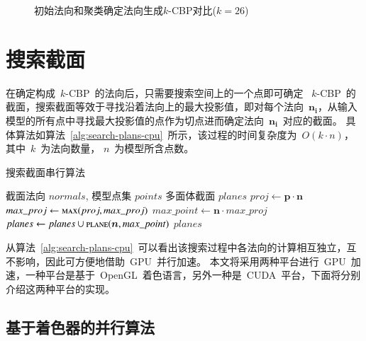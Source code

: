 \begin{figure}[htbp]
\setcounter{subfigure}{0}
  \centering
  \hspace{3em}%
  \hspace{3em}%
  \caption{初始法向和聚类确定法向生成$k$-CBP对比($k=26$)}
  \label{lbl:kemans-fixed-kcbp}
\end{figure}

\section{搜索截面}
\label{sec:search:planes}

在确定构成~$k$-CBP~的法向后，只需要搜索空间上的一个点即可确定
~$k$-CBP~的截面，搜索截面等效于寻找沿着法向上的最大投影值，即对每个法向~$\bm{n_i}$，从输入模型的所有点中寻找最大投影值的点作为切点进而确定法向~$\bm{n_i}$~对应的截面。
具体算法如算法~\ref{alg:search-plans-cpu}~所示，该过程的时间复杂度为~$O(k\cdot
n)$， 其中~$k$~为法向数量， $n$~为模型所含点数。

\begin{algorithm}[htbp]
\small
\caption{搜索截面串行算法}
\label{alg:search-plans-cpu}
\begin{algorithmic}[1]
\Require
截面法向 $normals$, 模型点集 $points$
\Ensure
多面体截面 $planes$
          \State $proj \gets  \bm{p} \cdot \bm{n}$ 
          \State $max\_proj \gets \Call{max}{proj, max\_proj}$ 
      \EndFor
  \EndFor
      \State $max\_point \gets \bm{n} \cdot max\_proj$ 
      \State $planes\gets planes \cup \Call{plane}{\bm{n}, max\_point}$ 
  \EndFor
  \State \Return $planes$
\EndFunction
\end{algorithmic}
\end{algorithm}

从算法~\ref{alg:search-plans-cpu}~可以看出该搜索过程中各法向的计算相互独立，互不影响，因此可方便地借助~GPU~并行加速。
本文将采用两种平台进行~GPU~加速，一种平台是基于~OpenGL~着色语言，另外一种是~CUDA~平台，下面将分别介绍这两种平台的实现。

\subsection{基于着色器的并行算法}
\label{subsec:determ-normals-by-shader}

